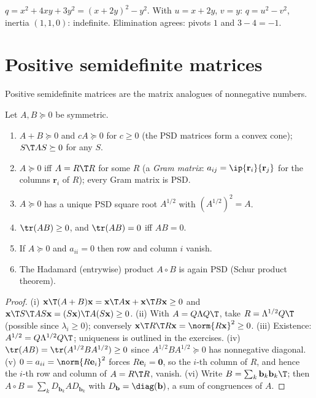 \begin{example}
$q=x^2+4xy+3y^2=(x+2y)^2-y^2$. With $u=x+2y$, $v=y$: $q=u^2-v^2$, inertia $(1,1,0)$: indefinite. Elimination agrees: pivots $1$ and $3-4=-1$.
\end{example}

\section{Positive semidefinite matrices}

Positive semidefinite matrices are the matrix analogues of nonnegative numbers.

\begin{theorem}\label{thm:psd}
Let $A,B\succeq0$ be symmetric.
\begin{enumerate}[label=(\roman*)]
  \item $A+B\succeq0$ and $cA\succeq0$ for $c\ge0$ (the PSD matrices form a convex cone); $S\T AS\succeq0$ for any $S$.
  \item $A\succeq0$ iff $A=R\T R$ for some $R$ (a \emph{Gram matrix}: $a_{ij}=\ip{\mathbf{r}_i}{\mathbf{r}_j}$ for the columns $\mathbf{r}_i$ of $R$); every Gram matrix is PSD.
  \item $A\succeq0$ has a unique PSD square root $A^{1/2}$ with $(A^{1/2})^2=A$.
  \item $\tr(AB)\ge0$, and $\tr(AB)=0$ iff $AB=0$.
  \item If $A\succeq0$ and $a_{ii}=0$ then row and column $i$ vanish.
  \item The Hadamard (entrywise) product $A\circ B$ is again PSD (Schur product theorem).
\end{enumerate}
\end{theorem}

\begin{proof}
(i) $\mathbf{x}\T(A+B)\mathbf{x}=\mathbf{x}\T A\mathbf{x}+\mathbf{x}\T B\mathbf{x}\ge0$ and $\mathbf{x}\T S\T AS\mathbf{x}=(S\mathbf{x})\T A(S\mathbf{x})\ge0$. (ii) With $A=Q\Lambda Q\T$, take $R=\Lambda^{1/2}Q\T$ (possible since $\lambda_i\ge0$); conversely $\mathbf{x}\T R\T R\mathbf{x}=\norm{R\mathbf{x}}^2\ge0$. (iii) Existence: $A^{1/2}=Q\Lambda^{1/2}Q\T$; uniqueness is outlined in the exercises. (iv) $\tr(AB)=\tr(A^{1/2}BA^{1/2})\ge0$ since $A^{1/2}BA^{1/2}\succeq0$ has nonnegative diagonal. (v) $0=a_{ii}=\norm{R\mathbf{e}_i}^2$ forces $R\mathbf{e}_i=\mathbf{0}$, so the $i$-th column of $R$, and hence the $i$-th row and column of $A=R\T R$, vanish. (vi) Write $B=\sum_k\mathbf{b}_k\mathbf{b}_k\T$; then $A\circ B=\sum_k D_{\mathbf{b}_k}AD_{\mathbf{b}_k}$ with $D_{\mathbf{b}}=\diag(\mathbf{b})$, a sum of congruences of $A$.
\end{proof}


